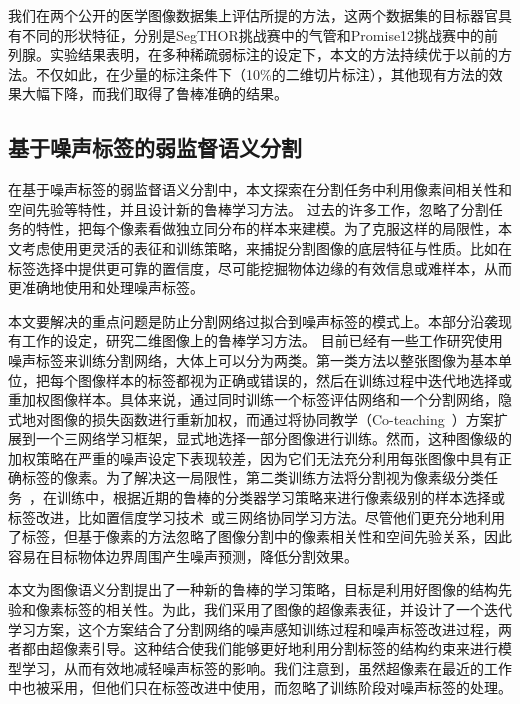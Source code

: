我们在两个公开的医学图像数据集上评估所提的方法，这两个数据集的目标器官具有不同的形状特征，分别是SegTHOR挑战赛\citep{trullo2019multiorgan}中的气管和Promise12挑战赛\citep{Litjens2014EvaluationOP}中的前列腺。实验结果表明，在多种稀疏弱标注的设定下，本文的方法持续优于以前的方法。不仅如此，在少量的标注条件下（10\%的二维切片标注），其他现有方法的效果大幅下降，而我们取得了鲁棒准确的结果。

\subsection{基于噪声标签的弱监督语义分割}
在基于噪声标签的弱监督语义分割中，本文探索在分割任务中利用像素间相关性和空间先验等特性，并且设计新的鲁棒学习方法。
过去的许多工作，忽略了分割任务的特性，把每个像素看做独立同分布的样本来建模。为了克服这样的局限性，本文考虑使用更灵活的表征和训练策略，来捕捉分割图像的底层特征与性质。比如在标签选择中提供更可靠的置信度，尽可能挖掘物体边缘的有效信息或难样本，从而更准确地使用和处理噪声标签。

本文要解决的重点问题是防止分割网络过拟合到噪声标签的模式上。本部分沿袭现有工作的设定，研究二维图像上的鲁棒学习方法。
目前已经有一些工作研究使用噪声标签来训练分割网络，大体上可以分为两类。第一类方法以整张图像为基本单位，把每个图像样本的标签都视为正确或错误的，然后在训练过程中迭代地选择或重加权图像样本\citep{Zhu2019PickandLearnAQ,Xue2020CascadedRL}。具体来说，\citet{Zhu2019PickandLearnAQ}通过同时训练一个标签评估网络和一个分割网络，隐式地对图像的损失函数进行重新加权，而\citet{Xue2020CascadedRL}通过将协同教学（Co-teaching~\cite{Han2018CoteachingRT}）方案扩展到一个三网络学习框架，显式地选择一部分图像进行训练。然而，这种图像级的加权策略在严重的噪声设定下表现较差，因为它们无法充分利用每张图像中具有正确标签的像素。为了解决这一局限性，第二类训练方法将分割视为像素级分类任务~\citep{Zhang2020CharacterizingLE,Zhang2020RobustMI}，在训练中，根据近期的鲁棒的分类器学习策略来进行像素级别的样本选择或标签改进，比如置信度学习技术~\citep{Zhang2020CharacterizingLE}或三网络协同学习方法\citep{Zhang2020RobustMI}。尽管他们更充分地利用了标签，但基于像素的方法忽略了图像分割中的像素相关性和空间先验关系，因此容易在目标物体边界周围产生噪声预测，降低分割效果。

本文为图像语义分割提出了一种新的鲁棒的学习策略，目标是利用好图像的结构先验和像素标签的相关性。为此，我们采用了图像的超像素表征，并设计了一个迭代学习方案，这个方案结合了分割网络的噪声感知训练过程和噪声标签改进过程，两者都由超像素引导。这种结合使我们能够更好地利用分割标签的结构约束来进行模型学习，从而有效地减轻噪声标签的影响。我们注意到，虽然超像素在最近的工作中也被采用\citep{li2019supervised}，但他们只在标签改进中使用，而忽略了训练阶段对噪声标签的处理。

